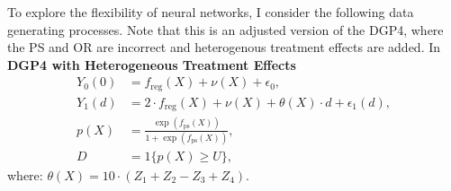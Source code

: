 




To explore the flexibility of neural networks, I consider the following data generating processes. Note that this is an adjusted version of the DGP4, where the PS and OR are incorrect and heterogenous treatment effects are added. In \\
\textbf{DGP4 with Heterogeneous Treatment Effects}
\begin{align*}
    Y_0(0) &= f_{\text{reg}}(X) + \nu(X) + \epsilon_0, \\
    Y_1(d) &= 2 \cdot f_{\text{reg}}(X) + \nu(X) + \theta(X) \cdot d + \epsilon_1(d), \\
    p(X) &= \frac{\exp \left( f_{\text{ps}}(X) \right)}{1 + \exp \left( f_{\text{ps}}(X) \right)}, \\
    D &= 1\{ p(X) \geq U \},
\end{align*}
where: $\theta(X) = 10 \cdot (Z_1 + Z_2 - Z_3 + Z_4)$.

